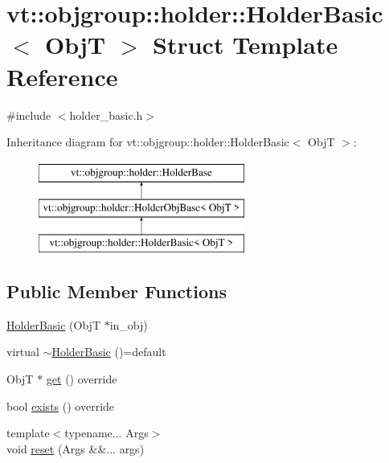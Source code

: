\hypertarget{structvt_1_1objgroup_1_1holder_1_1_holder_basic}{}\section{vt\+:\+:objgroup\+:\+:holder\+:\+:Holder\+Basic$<$ ObjT $>$ Struct Template Reference}
\label{structvt_1_1objgroup_1_1holder_1_1_holder_basic}


{\ttfamily \#include $<$holder\+\_\+basic.\+h$>$}

Inheritance diagram for vt\+:\+:objgroup\+:\+:holder\+:\+:Holder\+Basic$<$ ObjT $>$\+:\begin{figure}[H]
\begin{center}
\leavevmode
\includegraphics[height=3.000000cm]{structvt_1_1objgroup_1_1holder_1_1_holder_basic}
\end{center}
\end{figure}
\subsection*{Public Member Functions}
\begin{DoxyCompactItemize}
\item 
\hyperlink{structvt_1_1objgroup_1_1holder_1_1_holder_basic_a0e74a9b5eb928c8d9cdaf81dd0994d7b}{Holder\+Basic} (ObjT $\ast$in\+\_\+obj)
\item 
virtual \hyperlink{structvt_1_1objgroup_1_1holder_1_1_holder_basic_a7446aae8de5ccb8e9cceee2143ca29ea}{$\sim$\+Holder\+Basic} ()=default
\item 
ObjT $\ast$ \hyperlink{structvt_1_1objgroup_1_1holder_1_1_holder_basic_af1d605b64e5f9d77d4b291c402133f3f}{get} () override
\item 
bool \hyperlink{structvt_1_1objgroup_1_1holder_1_1_holder_basic_ab52459a275afea84f6650d206fe5b3dc}{exists} () override
\item 
{\footnotesize template$<$typename... Args$>$ }\\void \hyperlink{structvt_1_1objgroup_1_1holder_1_1_holder_basic_ae0e03732280c6c1cf44f9ff8f24426c2}{reset} (Args \&\&... args)
\end{DoxyCompactItemize}
